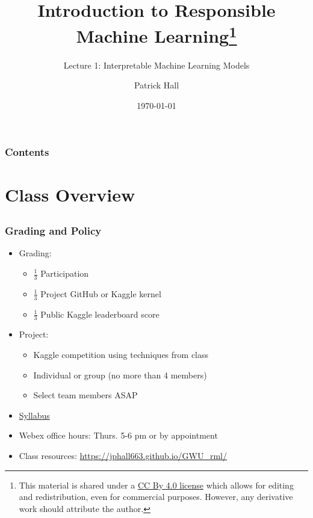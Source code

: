 \documentclass[11pt,aspectratio=169,hyperref={colorlinks}]{beamer}
\author{Patrick Hall}
\title{Introduction to Responsible Machine Learning\footnote{\tiny{This material is shared under a \href{https://creativecommons.org/licenses/by/4.0/deed.ast}{CC By 4.0 license} which allows for editing and redistribution, even for commercial purposes. However, any derivative work should attribute the author.}}}
\subtitle{Lecture 1: Interpretable Machine Learning Models}
\institute{The George Washington University}
\date{\today}
\begin{document}
	
	\maketitle
	
	\begin{frame}
	
		\frametitle{Contents}
		
		\tableofcontents{}
		
	\end{frame}
	

	\section{Class Overview}
	\subsection*{}
	
	\begin{frame}
	
		\frametitle{Grading and Policy}
			
		\begin{itemize}
			\item{Grading:}
				\begin{itemize}
					\item{$\frac{1}{3}$ Participation}
					\item{$\frac{1}{3}$ Project GitHub or Kaggle kernel}
                    \item{$\frac{1}{3}$ Public Kaggle leaderboard score}
				\end{itemize}
			\item{Project:}	
				\begin{itemize}
					\item{Kaggle competition using techniques from class}
					\item{Individual or group (no more than 4 members)}
					\item Select team members ASAP
				\end{itemize}
			\item \href{https://github.com/jphall663/GWU_rml/blob/master/rml_syllabus_summer_2020.pdf}{Syllabus}
			\item{Webex office hours: Thurs. 5-6 pm or by appointment}
			\item{Class resources: \url{https://jphall663.github.io/GWU_rml/}}	
		\end{itemize}		
			
	\end{frame}
	
\end{document}
